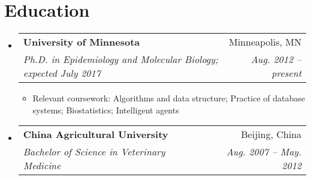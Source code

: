 \documentclass[letterpaper,11pt]{article}
\makeatletter
\newcommand{\resumeItem}[2]{
  \item\small{
    \textbf{#1}{: #2 \vspace{-2pt}}
  }
}
\newcommand{\resumeSubheading}[4]{
  \vspace{-1pt}\item
    \begin{tabular*}{0.97\textwidth}{l@{\extracolsep{\fill}}r}
      \textbf{#1} & #2 \\
      \textit{\small#3} & \textit{\small #4} \\
    \end{tabular*}\vspace{-5pt}
}
\newcommand{\resumeSubItem}[2]{\resumeItem{#1}{#2}\vspace{-4pt}}
\newcommand{\resumeSubHeadingListStart}{\begin{itemize}[leftmargin=*]}
\newcommand{\resumeSubHeadingListEnd}{\end{itemize}}
\newcommand{\resumeItemListStart}{\begin{itemize}}
\newcommand{\resumeItemListEnd}{\end{itemize}\vspace{-5pt}}
\makeatother
\begin{document}
%
  
  

\section{Education}
  \resumeSubHeadingListStart
   \resumeSubheading
      {University of Minnesota}{Minneapolis, MN}
      {Ph.D. in Epidemiology and Molecular Biology; expected July 2017}
      {Aug. 2012 -- present}
       \resumeItemListStart
 	\item {Relevant coursework: Algorithms and data structure; Practice of database systems;
Biostatistics; Intelligent agents}
	\resumeItemListEnd
    \resumeSubheading
      {China Agricultural University}{Beijing, China}
      {Bachelor of Science in Veterinary Medicine}{Aug. 2007 -- May. 2012}
  \resumeSubHeadingListEnd



  
  
\end{document}
